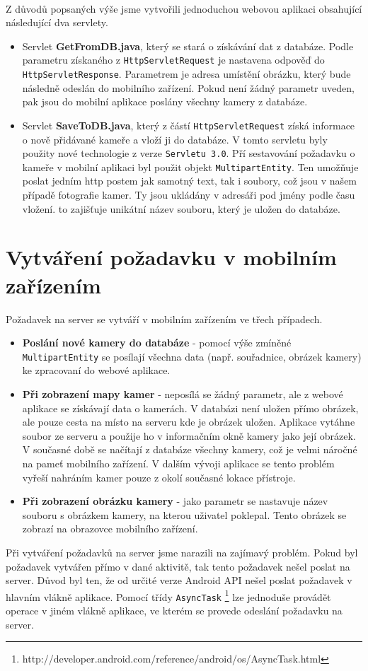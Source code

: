 \paragraph{}
Z důvodů popsaných výše jsme vytvořili jednoduchou webovou aplikaci obsahující následující dva servlety. 
\begin{itemize}
\item Servlet \textbf{GetFromDB.java}, který se stará o získávání dat z databáze. Podle parametru získaného z \texttt{HttpServletRequest} je nastavena odpověď do \texttt{HttpServletResponse}. Parametrem je adresa umístění obrázku, který bude následně odeslán do mobilního zařízení. Pokud není žádný parametr uveden, pak jsou do mobilní aplikace poslány všechny kamery z databáze.
\item Servlet \textbf{SaveToDB.java}, který z částí \texttt{HttpServletRequest} získá informace o nově přidávané kameře a vloží ji do databáze. V tomto servletu byly použity nové technologie z verze \texttt{Servletu 3.0}. Pří sestavování požadavku o kameře v mobilní aplikaci byl použit objekt \texttt{MultipartEntity}. Ten umož\v{n}uje poslat jedním http postem jak samotný text, tak i soubory, což jsou v našem případě fotografie kamer. Ty jsou ukládány v adresáři pod jmény podle času vložení. to zajiš\v{t}uje unikátní název souboru, který je uložen do databáze.
\end{itemize}

\section{Vytváření požadavku v mobilním zařízením}
Požadavek na server se vytváří v mobilním zařízením ve třech případech.
\begin{itemize}
\item \textbf{Poslání nové kamery do databáze} - pomocí výše zmíněné \texttt{MultipartEntity} se posílají všechna data (např. souřadnice, obrázek kamery) ke zpracovaní do webové aplikace.
\item \textbf{Při zobrazení mapy kamer} - neposílá se žádný parametr, ale z webové aplikace se získávají data o kamerách. V databázi není uložen přímo obrázek, ale pouze cesta na místo na serveru kde je obrázek uložen. Aplikace vytáhne soubor ze serveru a použije ho v informačním okně kamery jako její obrázek. V současné době se načítají z databáze všechny kamery, což je velmi náročné na pame\v{t} mobilního zařízení. V dalším vývoji aplikace se tento problém vyřeší nahráním kamer pouze z okolí současné lokace přístroje.
\item \textbf{Při zobrazení obrázku kamery} - jako parametr se nastavuje název souboru s obrázkem kamery, na kterou uživatel poklepal. Tento obrázek se zobrazí na obrazovce mobilního zařízení. 
\end{itemize} 
Při vytváření požadavků na server jsme narazili na zajímavý problém. Pokud byl požadavek vytvářen přímo v dané aktivitě, tak tento požadavek nešel poslat na server. Důvod byl ten, že od určité verze Android API nešel poslat požadavek v hlavním vlákně aplikace. Pomocí třídy \texttt{AsyncTask} \footnote{http://developer.android.com/reference/android/os/AsyncTask.html} lze jednoduše provádět operace v jiném vlákně aplikace, ve kterém se provede odeslání požadavku na server. 